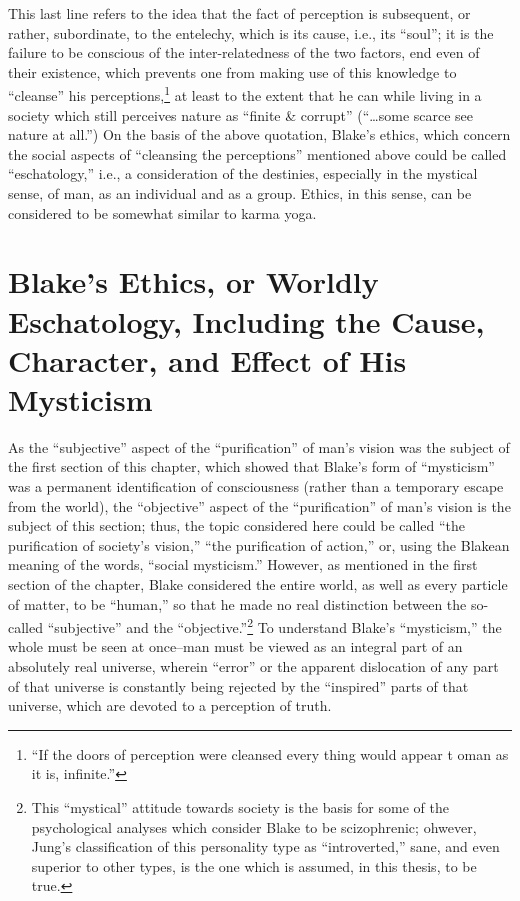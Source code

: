 This last line refers to the idea that the fact of perception is subsequent, or rather, subordinate, to the
entelechy, which is its cause, i.e., its \enquote{soul}; it is the failure to be conscious of the inter-relatedness of the two factors, end even
of their existence, which prevents one from making use of this knowledge to \enquote{cleanse} his perceptions,\footnote{\enquote{If the doors of perception were cleansed every thing would appear t oman as it is, infinite.}\supercite{keynes:william-blake}}
at least to the extent that he can while living in a society which still perceives nature as \enquote{finite \& corrupt} (\enquote{\dots some
scarce see nature at all.}\supercite{keynes:william-blake}) On the basis of the above quotation, Blake's ethics, which concern the social aspects of
\enquote{cleansing the perceptions} mentioned above could be called \enquote{eschatology,} i.e., a consideration of the destinies, especially in the
mystical sense, of man, as an individual and as a group. Ethics, in this sense, can be considered to be somewhat similar to karma yoga.

\section[Blake's Ethics, or Worldly Eschatology, Including the\\Cause, Character, and Effect of His Mysticism]{Blake's Ethics, or Worldly Eschatology, Including the Cause, Character, and Effect of His Mysticism}

As the \enquote{subjective} aspect of the \enquote{purification} of man's vision was the subject of the first section of this chapter, which showed that
Blake's form of \enquote{mysticism} was a permanent identification of consciousness (rather than a temporary escape from the world), the  \enquote{objective} aspect of
the \enquote{purification} of man's vision is the subject of this section; thus, the topic considered here could be called \enquote{the purification of society's vision,} \enquote{the
purification of action,} or, using the Blakean meaning of the words, \enquote{social mysticism.} However, as mentioned in the first section of the chapter, Blake considered the entire world,
as well as every particle of matter, to be \enquote{human,} so that he made no real distinction between the so-called \enquote{subjective} and the \enquote{objective.}\footnote{This \enquote{mystical} attitude towards society is the basis for some of the psychological analyses which consider Blake to be scizophrenic; ohwever, Jung's classification of this personality type as \enquote{introverted,} sane, and even superior to other types, is the one which is assumed, in this thesis, to be true.}
To understand Blake's \enquote{mysticism,} the whole must be seen at once--man must be viewed as an integral part of an absolutely real universe, wherein \enquote{error} or the apparent dislocation of any part of that
universe is constantly being rejected by the \enquote{inspired} parts of that universe, which are devoted to a perception of truth.

